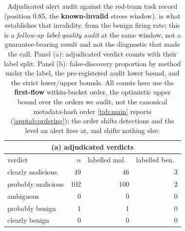 \begin{table}[t]
\centering
\caption{Adjudicated alert audit against the red-team task record (position 0.85, the
\textbf{known-invalid} stress window).  is what establishes that invalidity, from
the benign firing rate; this is a \emph{follow-up label-quality audit} at the same window, not a
guarantee-bearing result and not the diagnostic that made the call. Panel (a):
adjudicated verdict counts with their label split. Panel (b): false-discovery proportion by
method under the label, the pre-registered audit lower bound, and the strict lower/upper bounds.
All counts here use the \textbf{first-flow} within-bucket order, the optimistic upper bound over the orders we audit, not the canonical metadata-hash order \cref{tab:main} reports (\cref{apptab:ordering}); the order shifts detections and the level an alert fires at, and shifts nothing else.}
\label{apptab:audit}
\begin{tabular}{lrrr}
\toprule
\multicolumn{4}{c}{(a) adjudicated verdicts} \\
\midrule
verdict & $n$ & labelled mal.\ & labelled ben.\ \\
\midrule
clearly malicious & 49 & 46 & 3 \\
probably malicious & 102 & 100 & 2 \\
ambiguous & 0 & 0 & 0 \\
probably benign & 1 & 1 & 0 \\
clearly benign & 0 & 0 & 0 \\
\bottomrule
\end{tabular}

\vspace{4pt}
\end{table}
